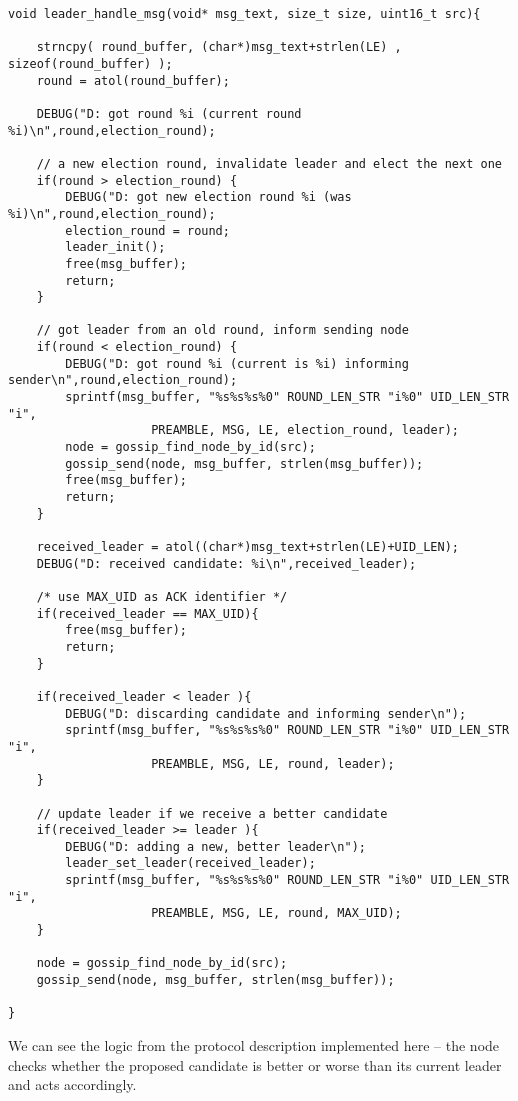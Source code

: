 \documentclass[11pt,
  a4paper,
  ngerman,
  BCOR=7mm
]{scrartcl}
\begin{document}
\begin{lstlisting}
void leader_handle_msg(void* msg_text, size_t size, uint16_t src){

    strncpy( round_buffer, (char*)msg_text+strlen(LE) , sizeof(round_buffer) );
    round = atol(round_buffer);

    DEBUG("D: got round %i (current round %i)\n",round,election_round);

    // a new election round, invalidate leader and elect the next one
    if(round > election_round) {
        DEBUG("D: got new election round %i (was %i)\n",round,election_round);
        election_round = round;
        leader_init();
        free(msg_buffer);
        return;
    }

    // got leader from an old round, inform sending node
    if(round < election_round) {
        DEBUG("D: got round %i (current is %i) informing sender\n",round,election_round);
        sprintf(msg_buffer, "%s%s%s%0" ROUND_LEN_STR "i%0" UID_LEN_STR "i",
                    PREAMBLE, MSG, LE, election_round, leader);
        node = gossip_find_node_by_id(src);
        gossip_send(node, msg_buffer, strlen(msg_buffer));
        free(msg_buffer);
        return;
    }

    received_leader = atol((char*)msg_text+strlen(LE)+UID_LEN);
    DEBUG("D: received candidate: %i\n",received_leader);

    /* use MAX_UID as ACK identifier */
    if(received_leader == MAX_UID){
        free(msg_buffer);
        return;
    }

    if(received_leader < leader ){
        DEBUG("D: discarding candidate and informing sender\n");
        sprintf(msg_buffer, "%s%s%s%0" ROUND_LEN_STR "i%0" UID_LEN_STR "i",
                    PREAMBLE, MSG, LE, round, leader);
    }

    // update leader if we receive a better candidate
    if(received_leader >= leader ){
        DEBUG("D: adding a new, better leader\n");
        leader_set_leader(received_leader);
        sprintf(msg_buffer, "%s%s%s%0" ROUND_LEN_STR "i%0" UID_LEN_STR "i",
                    PREAMBLE, MSG, LE, round, MAX_UID);
    }

    node = gossip_find_node_by_id(src);
    gossip_send(node, msg_buffer, strlen(msg_buffer));

}
\end{lstlisting}

We can see the logic from the protocol description implemented here --
the node checks whether the proposed candidate is better or worse than
its current leader and acts accordingly.
\end{document}
